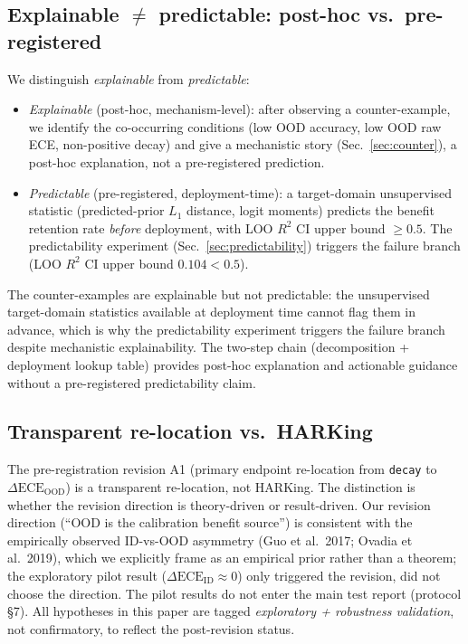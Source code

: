 \documentclass[review,12pt,nonatbib]{elsarticle}
\begin{document}
\subsection{Explainable $\neq$ predictable: post-hoc vs.\ pre-registered}
We distinguish \emph{explainable} from \emph{predictable}:
\begin{itemize}
    \item \emph{Explainable} (post-hoc, mechanism-level): after
    observing a counter-example, we identify the co-occurring
    conditions (low OOD accuracy, low OOD raw ECE, non-positive
    decay) and give a mechanistic story (Sec.~\ref{sec:counter}), a
    post-hoc explanation, not a pre-registered prediction.
    \item \emph{Predictable} (pre-registered, deployment-time): a
    target-domain unsupervised statistic (predicted-prior $L_1$
    distance, logit moments) predicts the benefit retention rate
    \emph{before} deployment, with LOO $R^2$ CI upper bound
    $\geq 0.5$. The predictability experiment
    (Sec.~\ref{sec:predictability}) triggers the failure branch
    (LOO $R^2$ CI upper bound $0.104<0.5$).
\end{itemize}
The counter-examples are explainable but not predictable: the
unsupervised target-domain statistics available at deployment time
cannot flag them in advance, which is why the predictability
experiment triggers the failure branch despite mechanistic
explainability. The two-step chain (decomposition + deployment
lookup table) provides post-hoc explanation and actionable guidance
without a pre-registered predictability claim.

\subsection{Transparent re-location vs.\ HARKing}
The pre-registration revision A1 (primary endpoint re-location from
\texttt{decay} to $\Delta\text{ECE}_{\text{OOD}}$) is a transparent
re-location, not HARKing. The distinction
\cite{lakens2019prereg,nosek2019prereg} is whether the revision
direction is theory-driven or
result-driven. Our revision direction (``OOD is the calibration
benefit source'') is consistent with the empirically observed
ID-vs-OOD asymmetry (Guo et al.\ 2017; Ovadia et al.\ 2019), which we
explicitly frame as an empirical prior rather than a theorem; the
exploratory pilot result ($\Delta\text{ECE}_{\text{ID}}\approx 0$)
only triggered the revision, did not choose the direction. The
pilot results do not enter the main test report (protocol \S7).
All hypotheses in this paper are tagged \emph{exploratory + robustness
validation}, not confirmatory, to reflect the post-revision status.
\end{document}
